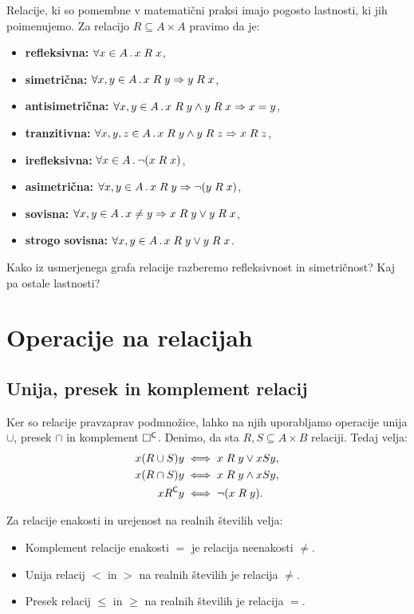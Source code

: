 Relacije, ki so pomembne v matematični praksi imajo pogosto lastnosti, ki jih poimenujemo. Za relacijo $R \subseteq A \times A$ pravimo da je:
%
\begin{itemize}
  \item \textbf{refleksivna:} $\forall x \in A \,.\, x \mathrel{R} x$,
  \item \textbf{simetrična:} $\forall x, y \in A \,.\, x \mathrel{R} y \Rightarrow y \mathrel{R} x$,
  \item \textbf{antisimetrična:} $\forall x, y \in A \,.\, x \mathrel{R} y \land y \mathrel{R} x \Rightarrow x = y$,
  \item \textbf{tranzitivna:} $\forall x, y, z \in A \,.\, x \mathrel{R} y \land y \mathrel{R} z \Rightarrow x \mathrel{R} z$,
  \item \textbf{irefleksivna:} $\forall x \in A \,.\, \lnot (x \mathrel{R} x)$,
  \item \textbf{asimetrična:} $\forall x, y \in A \,.\, x \mathrel{R} y \Rightarrow \lnot (y \mathrel{R} x)$,
  \item \textbf{sovisna:} $\forall x, y \in A \,.\, x \neq y \Rightarrow x \mathrel{R} y \lor y \mathrel{R} x$,
  \item \textbf{strogo sovisna:} $\forall x, y \in A \,.\, x \mathrel{R} y \lor y \mathrel{R} x$.
\end{itemize}
%

\begin{naloga}
  Kako iz usmerjenega grafa relacije razberemo refleksivnost in simetričnost? Kaj pa ostale lastnosti?
\end{naloga}

\section{Operacije na relacijah}

\subsection{Unija, presek in komplement relacij}

Ker so relacije pravzaprav podmnožice, lahko na njih uporabljamo operacije unija $\cup$,
presek $\cap$ in komplement $\Box^{\mathsf{C}}$. Denimo, da sta $R, S \subseteq A \times B$ relaciji. Tedaj velja:
%
\begin{align*}
  x (R \cup S) y &\iff x \mathrel{R} y \lor x S y, \\
  x (R \cap S) y &\iff x \mathrel{R} y \land x S y, \\
  x R^{\mathsf{C}} y &\iff \lnot (x \mathrel{R} y).
\end{align*}

\begin{primer}
  Za relacije enakosti in urejenost na realnih številih velja:
  \begin{itemize}
  \item Komplement relacije enakosti $=$ je relacija neenakosti $\neq$.
  \item Unija relacij $<$ in $>$ na realnih številih je relacija $\neq$.
  \item Presek relacij $\leq$ in $\geq$ na realnih številih je relacija $=$.
  \end{itemize}
\end{primer}


